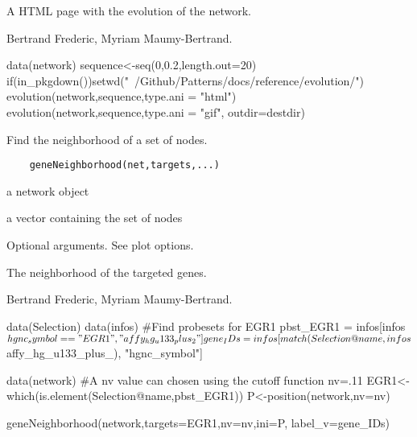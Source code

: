 \documentclass[a4paper]{book}
\begin{document}
%
\begin{Value}
 A HTML page with the evolution of the network.
\end{Value}
%
\begin{Author}\relax
Bertrand Frederic, Myriam Maumy-Bertrand.
\end{Author}
%
\begin{Examples}
\begin{ExampleCode}

	data(network)
	sequence<-seq(0,0.2,length.out=20)
	if(in_pkgdown()){setwd("~/Github/Patterns/docs/reference/evolution/")}
	evolution(network,sequence,type.ani = "html")
	evolution(network,sequence,type.ani = "gif", outdir=destdir)

\end{ExampleCode}
\end{Examples}
%
\begin{Description}\relax
Find the neighborhood of a set of nodes.
\end{Description}
%
\begin{Usage}
\begin{verbatim}
	geneNeighborhood(net,targets,...)
\end{verbatim}
\end{Usage}
%
\begin{Arguments}
\begin{ldescription}
\item[\code{net}] a network object
\item[\code{targets}] a vector containing the set of nodes
\item[\code{...}] Optional arguments. See plot options. 
\end{ldescription}
\end{Arguments}
%
\begin{Value}
The neighborhood of the targeted genes. 
\end{Value}
%
\begin{Author}\relax
Bertrand Frederic, Myriam Maumy-Bertrand.
\end{Author}
%
\begin{Examples}
\begin{ExampleCode}
data(Selection)
data(infos)
#Find probesets for EGR1
pbst_EGR1 = infos[infos$hgnc_symbol=="EGR1", "affy_hg_u133_plus_2"]

gene_IDs = infos[match(Selection@name, infos$affy_hg_u133_plus_), "hgnc_symbol"]

data(network)
#A nv value can chosen using the cutoff function
nv=.11 
EGR1<-which(is.element(Selection@name,pbst_EGR1))
P<-position(network,nv=nv)

geneNeighborhood(network,targets=EGR1,nv=nv,ini=P,
label_v=gene_IDs)
\end{ExampleCode}
\end{Examples}
\end{document}
